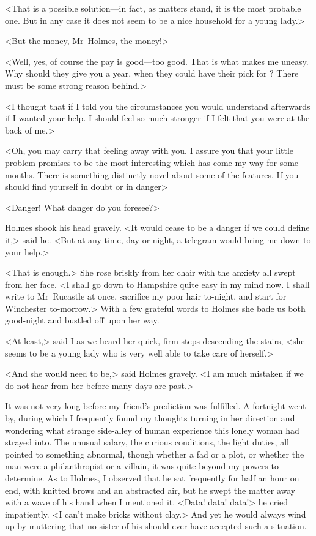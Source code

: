 <That is a possible solution—in fact, as matters stand, it is the most probable one. But in any case it does not seem to be a nice household for a young lady.>

<But the money, Mr~Holmes, the money!>

<Well, yes, of course the pay is good—too good. That is what makes me uneasy. Why should they give you  a year, when they could have their pick for ? There must be some strong reason behind.>

<I thought that if I told you the circumstances you would understand afterwards if I wanted your help. I should feel so much stronger if I felt that you were at the back of me.>

<Oh, you may carry that feeling away with you. I assure you that your little problem promises to be the most interesting which has come my way for some months. There is something distinctly novel about some of the features. If you should find yourself in doubt or in danger\longdash>

<Danger! What danger do you foresee?>

Holmes shook his head gravely. <It would cease to be a danger if we could define it,> said he. <But at any time, day or night, a telegram would bring me down to your help.>

<That is enough.> She rose briskly from her chair with the anxiety all swept from her face. <I shall go down to Hampshire quite easy in my mind now. I shall write to Mr~Rucastle at once, sacrifice my poor hair to-night, and start for Winchester to-morrow.> With a few grateful words to Holmes she bade us both good-night and bustled off upon her way.

<At least,> said I as we heard her quick, firm steps descending the stairs, <she seems to be a young lady who is very well able to take care of herself.>

<And she would need to be,> said Holmes gravely. <I am much mistaken if we do not hear from her before many days are past.>

It was not very long before my friend's prediction was fulfilled. A fortnight went by, during which I frequently found my thoughts turning in her direction and wondering what strange side-alley of human experience this lonely woman had strayed into. The unusual salary, the curious conditions, the light duties, all pointed to something abnormal, though whether a fad or a plot, or whether the man were a philanthropist or a villain, it was quite beyond my powers to determine. As to Holmes, I observed that he sat frequently for half an hour on end, with knitted brows and an abstracted air, but he swept the matter away with a wave of his hand when I mentioned it. <Data! data! data!> he cried impatiently. <I can't make bricks without clay.> And yet he would always wind up by muttering that no sister of his should ever have accepted such a situation.

